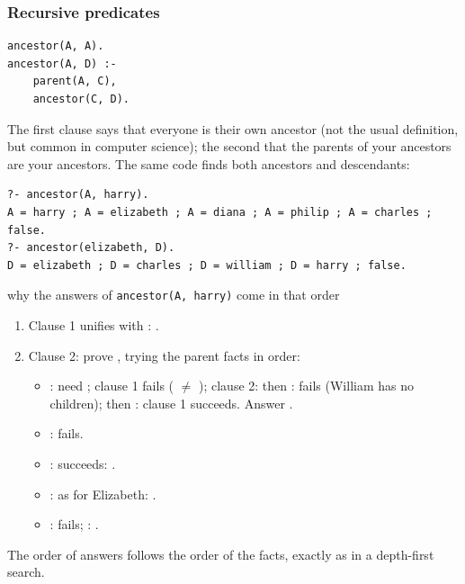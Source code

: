 \subsubsection{Recursive predicates}

\begin{verbatim}
ancestor(A, A).
ancestor(A, D) :-
    parent(A, C),
    ancestor(C, D).
\end{verbatim}
The first clause says that everyone is their own ancestor (not the usual definition, but
common in computer science); the second that the parents of your ancestors are your
ancestors. The same code finds both ancestors and descendants:
\begin{verbatim}
?- ancestor(A, harry).
A = harry ; A = elizabeth ; A = diana ; A = philip ; A = charles ; false.
?- ancestor(elizabeth, D).
D = elizabeth ; D = charles ; D = william ; D = harry ; false.
\end{verbatim}

\begin{nbexample}{why the answers of \texttt{ancestor(A, harry)} come in that order}
\notinslides
\begin{enumerate}[nosep]
  \item Clause 1 unifies  with : .
  \item Clause 2: prove , trying the parent facts in order:
  \begin{itemize}[nosep]
    \item {}: need ; clause 1
          fails ( $\neq$ ); clause 2: 
          then : fails (William has no children);
           then : clause 1 succeeds.
          Answer .
    \item {}:  fails.
    \item {}:  succeeds: .
    \item {}: as for Elizabeth: .
    \item {}: fails; : .
  \end{itemize}
\end{enumerate}
The order of answers follows the order of the facts, exactly as in a depth-first search.
\end{nbexample}

